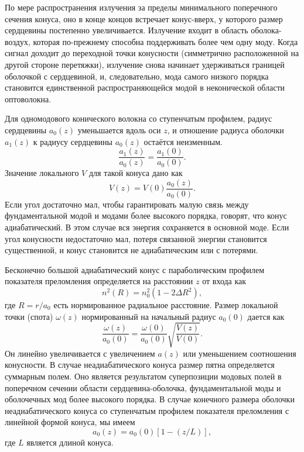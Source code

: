 По мере распространения излучения за пределы минимального поперечного сечения конуса, оно в конце концов встречает конус-вверх, у которого размер сердцевины постепенно увеличивается. Излучение входит в область оболока-воздух, которая по-прежнему способна поддерживать более чем одну моду. Когда сигнал доходит до переходной точки конусности (симметрично расположенной на другой стороне перетяжки), излучение снова начинает удерживаться границей оболочкой с сердцевиной, и, следовательно, мода самого низкого порядка становится единственной распространяющейся модой в неконической области оптоволокна.

Для одномодового конического волокна со ступенчатым профилем, радиус сердцевины $a_0(z)$ уменьшается вдоль оси $z$, и отношение радиуса оболочки $a_1(z)$ к радиусу сердцевины $a_0(z)$ остаётся неизменным.
\begin{equation}\label{eq_ch3_2.18}
  \frac{a_1(z)}{a_0(z)}=\frac{a_1(0)}{a_0(0)}.
\end{equation}
Значение локального $V$ для такой конуса дано как
\begin{equation}\label{eq_ch3_2.19}
  V(z)=V(0)\frac{a_0(z)}{a_0(0)}.
\end{equation}
Если угол достаточно мал, чтобы гарантировать малую связь между фундаментальной модой и модами более высокого порядка, говорят, что конус адиабатический. В этом случае вся энергия сохраняется в основной моде. Если угол конусности недостаточно мал, потеря связанной энергии становится существенной, и конус становится не адиабатическим или с потерями.

Бесконечно большой адиабатический конус с параболическим профилем показателя преломления определяется на расстоянии $z$ от входа как
\begin{equation}\label{eq_ch3_2.20}
  n^2(R)=n_0^2(1-2\Delta R^2),
\end{equation}
где $R=r/a_0$ есть нормированное радиальное расстояние. Размер локальной точки (спота) $\omega(z)$ нормированный на начальный радиус $a_0(0)$ дается как
\begin{equation}\label{eq_ch3_2.21}
  \frac{\omega(z)}{a_0(0)}=\frac{\omega(0)}{a_0(0)}\sqrt{\frac{V(z)}{V(0)}}.
\end{equation}
Он линейно увеличивается с увеличением $a(z)$ или уменьшением соотношения конусности. В случае неадиабатического конуса размер пятна определяется суммарным полем. Оно является результатом суперпозиции модовых полей в поперечном сечении области сердцевина-оболочка, фундаментальной моды и оболочечных мод более высокого порядка. В случае конечного размера оболочки неадиабатического конуса со ступенчатым профилем показателя преломления с линейной формой конуса, мы имеем
\begin{equation}\label{eq_ch3_2.22}
  a_0(z)=a_0(0)[1-(z/L)],
\end{equation}
где $L$ является длиной конуса.

